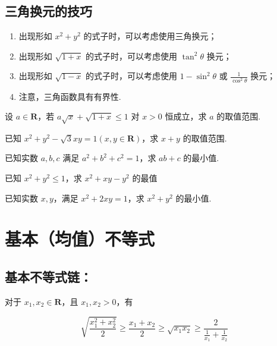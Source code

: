 \documentclass[a4paper , final]{ctexart}
\newenvironment{problem}[1]{%
  \item #1
  \par
  \vspace{8cm}
}{}
\begin{document}
\subsection*{三角换元的技巧}
\begin{enumerate}
  \item 出现形如 $x^2+y^2$ 的式子时，可以考虑使用三角换元；
  \item 出现形如 $\sqrt{1+x}$ 的式子时，可以考虑使用 $\tan^2\theta$ 换元；
  \item 出现形如 $\sqrt{1-x}$ 的式子时，可以考虑使用 $1-\sin^2\theta$ 或 $\frac{1}{\cos^2\theta}$ 换元；
  \item  注意，三角函数具有有界性.
\end{enumerate}

\begin{problems}
  \begin{problem}
  {
  设 $a\in\mathbf{R}$，若 $a\sqrt{x}+\sqrt{1+x}\leq 1$ 对 $x>0$ 恒成立，求 $a$ 的取值范围.
  }
  \end{problem}

  \begin{problem}
  {
  已知 $x^2+y^2-\sqrt{3}xy = 1(x,y\in\mathbf{R})$，求 $x+y$ 的取值范围.
  }
  \end{problem}
  \newpage
  \begin{problem}
  {
  已知实数 $a,b,c$ 满足 $a^2+b^2+c^2=1$，求 $ab+c$ 的最小值.
  }
  \end{problem}

  \begin{problem}
  {
  已知 $x^2+y^2\leq 1$，求 $x^2+xy-y^2$ 的最值
  }
  \end{problem}

  \begin{problem}
  {
  已知实数 $x,y$，满足 $x^2+2xy=1$，求 $x^2+y^2$ 的最小值.
  }
  \end{problem}
\end{problems}

\section*{基本（均值）不等式}

\subsection*{基本不等式链：}

对于 $x_1,x_2\in\mathbf{R}$，且 $x_1,x_2>0$，有

$$
  \sqrt{\frac{x_1^2+x_2^2}{2}}\geq \frac{x_1+x_2}{2} \geq \sqrt{x_1x_2} \geq\frac{2}{\frac{1}{x_1}+\frac{1}{x_2}}
$$
\end{document}
